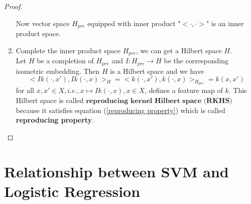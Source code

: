 \begin{proof}
\begin{enumerate}
	Now vector space $H_{pre}$ equipped with inner product "$<\cdot,\cdot>$" is an inner product space.
	\item Complete the inner product space $H_{pre}$, we can get a Hilbert space $H$.\\
	Let $H$ be a completion of $H_{pre}$ and $I:H_{pre} \rightarrow H$ be the corresponding isometric embedding. Then $H$ is a Hilbert space and we have
	$$
	<Ik(\cdot,x'),Ik(\cdot,x)>_H=<k(\cdot,x'),k(\cdot,x)>_{H_{pre}}=k(x,x')
	$$
	for all $x,x'\in X, i.e., x\mapsto Ik(\cdot,x), x\in X$, defines a feature map of $k$.
	This Hilbert space is called $\textbf{reproducing\ kernel\ Hilbert\ space\ (RKHS)}$ because it satisfies equation (\ref{reproducing property}) which is called \textbf{reproducing property}.
\end{enumerate}
\end{proof}

\section{Relationship between SVM and Logistic Regression}

